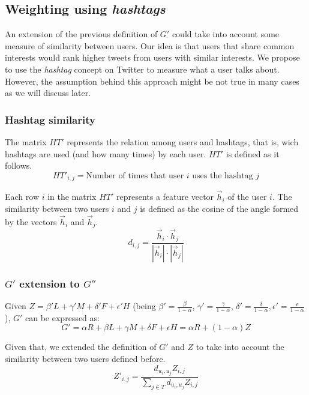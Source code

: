 \subsection{Weighting using \emph{hashtags}}
An extension of the previous definition of $G'$ could take into account some measure of similarity between users. Our idea is that users that share common interests would rank higher tweets from users with similar interests. We propose to use the \emph{hashtag} concept on Twitter to measure what a user talks about. However, the assumption behind this approach might be not true in many cases as we will discuss later.

\subsubsection*{Hashtag similarity}
The matrix $HT'$ represents the relation among users and hashtags, that is, wich hashtags are used (and how many times) by each user. $HT'$ is defined as it follows.
\begin{equation}
HT'_{i,j} = \text{Number of times that user } i \text{ uses the hashtag } j
\end{equation}

Each row $i$ in the matrix $HT'$ represents a feature vector $\vec{h}_i$ of the user $i$. The similarity between two users $i$ and $j$ is defined as the cosine of the angle formed by the vectors $\vec{h}_i$ and $\vec{h}_j$.
\begin{equation}
d_{i,j} = \frac{\vec{h}_i \cdot \vec{h}_j}{ |\vec{h}_i| \cdot |\vec{h}_j|}
\end{equation}

\subsubsection*{$G'$ extension to $G''$}
Given $Z = \beta' L + \gamma' M + \delta' F + \epsilon' H$ (being $\beta' = \frac{\beta}{1-\alpha}$, $\gamma' = \frac{\gamma}{1-\alpha}$, $\delta' = \frac{\delta}{1-\alpha}, \epsilon' = \frac{\epsilon}{1 - \alpha}$),  $G'$ can be expressed as:
\begin{equation}
G' = \alpha R + \beta L + \gamma M + \delta F + \epsilon H =  \alpha R + (1-\alpha) Z
\end{equation}

Given that, we extended the definition of $G'$ and $Z$ to take into account the similarity between two users defined before. 
\begin{equation}
Z'_{i,j} = \frac{d_{u_i,u_j} Z_{i,j}}{\sum_{j \in T}{d_{u_i,u_j} Z_{i,j}}}
\end{equation}


